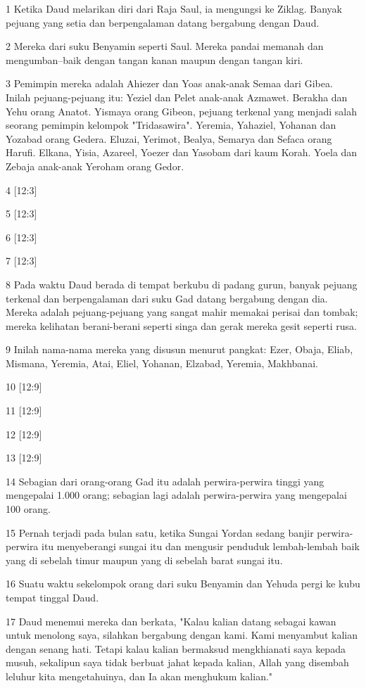 \par 1 Ketika Daud melarikan diri dari Raja Saul, ia mengungsi ke Ziklag. Banyak pejuang yang setia dan berpengalaman datang bergabung dengan Daud.
\par 2 Mereka dari suku Benyamin seperti Saul. Mereka pandai memanah dan mengumban--baik dengan tangan kanan maupun dengan tangan kiri.
\par 3 Pemimpin mereka adalah Ahiezer dan Yoas anak-anak Semaa dari Gibea. Inilah pejuang-pejuang itu: Yeziel dan Pelet anak-anak Azmawet. Berakha dan Yehu orang Anatot. Yismaya orang Gibeon, pejuang terkenal yang menjadi salah seorang pemimpin kelompok "Tridasawira". Yeremia, Yahaziel, Yohanan dan Yozabad orang Gedera. Eluzai, Yerimot, Bealya, Semarya dan Sefaca orang Harufi. Elkana, Yisia, Azareel, Yoezer dan Yasobam dari kaum Korah. Yoela dan Zebaja anak-anak Yeroham orang Gedor.
\par 4 [12:3]
\par 5 [12:3]
\par 6 [12:3]
\par 7 [12:3]
\par 8 Pada waktu Daud berada di tempat berkubu di padang gurun, banyak pejuang terkenal dan berpengalaman dari suku Gad datang bergabung dengan dia. Mereka adalah pejuang-pejuang yang sangat mahir memakai perisai dan tombak; mereka kelihatan berani-berani seperti singa dan gerak mereka gesit seperti rusa.
\par 9 Inilah nama-nama mereka yang disusun menurut pangkat: Ezer, Obaja, Eliab, Mismana, Yeremia, Atai, Eliel, Yohanan, Elzabad, Yeremia, Makhbanai.
\par 10 [12:9]
\par 11 [12:9]
\par 12 [12:9]
\par 13 [12:9]
\par 14 Sebagian dari orang-orang Gad itu adalah perwira-perwira tinggi yang mengepalai 1.000 orang; sebagian lagi adalah perwira-perwira yang mengepalai 100 orang.
\par 15 Pernah terjadi pada bulan satu, ketika Sungai Yordan sedang banjir perwira-perwira itu menyeberangi sungai itu dan mengusir penduduk lembah-lembah baik yang di sebelah timur maupun yang di sebelah barat sungai itu.
\par 16 Suatu waktu sekelompok orang dari suku Benyamin dan Yehuda pergi ke kubu tempat tinggal Daud.
\par 17 Daud menemui mereka dan berkata, "Kalau kalian datang sebagai kawan untuk menolong saya, silahkan bergabung dengan kami. Kami menyambut kalian dengan senang hati. Tetapi kalau kalian bermaksud mengkhianati saya kepada musuh, sekalipun saya tidak berbuat jahat kepada kalian, Allah yang disembah leluhur kita mengetahuinya, dan Ia akan menghukum kalian."
